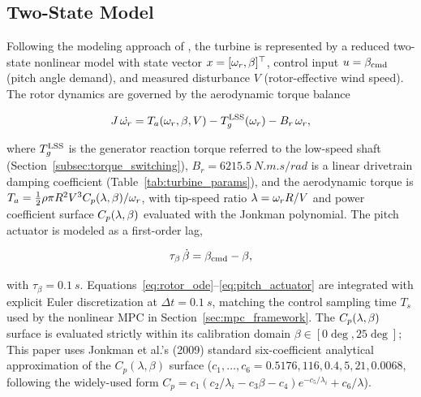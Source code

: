 \subsection{Two-State Model}
\label{subsec:two_state_model}

Following the modeling approach of \citet{klein2024}, the turbine is
represented by a reduced two-state nonlinear model with state vector
$x = [\omega_r, \beta]^\top$, control input $u = \beta_{\text{cmd}}$ (pitch angle
demand), and measured disturbance $V$ (rotor-effective wind speed). The
rotor dynamics are governed by the aerodynamic torque balance

\begin{equation}
J\,\dot{\omega_r} = T_a(\omega_r, \beta, V) - T_g^{\text{LSS}}(\omega_r) - B_r\,\omega_r,
\label{eq:rotor_ode}
\end{equation}

where $T_g^{\text{LSS}}$ is the generator reaction torque referred to the
low-speed shaft (Section~\ref{subsec:torque_switching}), $B_r =
\SI{6215.5}{N.m.s/rad}$ is a linear drivetrain damping coefficient
(Table~\ref{tab:turbine_params}), and the
aerodynamic torque is
$T_a = \tfrac{1}{2}\rho \pi R^2 V^3 C_p(\lambda,\beta) / \omega_r$, with tip-speed
ratio $\lambda = \omega_r R / V$ and power coefficient surface
$C_p(\lambda,\beta)$ evaluated with the Jonkman polynomial. The pitch
actuator is modeled as a first-order lag,

\begin{equation}
\tau_\beta\,\dot{\beta} = \beta_{\text{cmd}} - \beta,
\label{eq:pitch_actuator}
\end{equation}

with $\tau_\beta = \SI{0.1}{s}$. Equations~\eqref{eq:rotor_ode}--\eqref{eq:pitch_actuator}
are integrated with explicit Euler discretization at $\Delta t = \SI{0.1}{s}$,
matching the control sampling time $T_s$ used by the nonlinear MPC in
Section~\ref{sec:mpc_framework}. The $C_p(\lambda,\beta)$ surface is
evaluated strictly within its calibration domain $\beta \in [0\deg, 25\deg]$;
This paper uses Jonkman et al.'s (2009) standard six-coefficient
analytical approximation of the $C_p(\lambda,\beta)$ surface ($c_1, \ldots, c_6 = 0.5176, 116, 0.4, 5, 21, 0.0068$, following the widely-used form $C_p = c_1(c_2/\lambda_i - c_3\beta - c_4)e^{-c_5/\lambda_i} + c_6/\lambda$).

